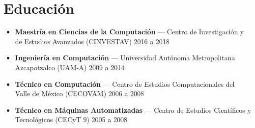 \section*{Educación}
\begin{itemize}[leftmargin=12pt]
    \item \textbf{Maestría en Ciencias de la Computación} — Centro de Investigación y de Estudios Avanzados (CINVESTAV) \hfill 2016 a 2018
    \item \textbf{Ingeniería en Computación} — Universidad Autónoma Metropolitana Azcapotzalco (UAM-A) \hfill 2009 a 2014
    \item \textbf{Técnico en Computación} — Centro de Estudios Computacionales del Valle de México (CECOVAM) \hfill 2006 a 2008
    \item \textbf{Técnico en Máquinas Automatizadas} — Centro de Estudios Científicos y Tecnológicos (CECyT 9) \hfill 2005 a 2008
\end{itemize}

